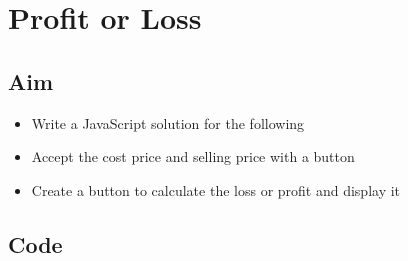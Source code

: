 \documentclass{article}
\begin{document}
\section{Profit or Loss}
\subsection{Aim}
\begin{itemize}
	\item Write a JavaScript solution for the following
	\item Accept the cost price and selling price with a button
	\item Create a button to calculate the loss or profit and display it
\end{itemize}

\subsection{Code}
\inputminted[frame=lines, breaklines, breakanywhere, numberblanklines=false]{html}{./prog_6/index.html}
\end{document}
